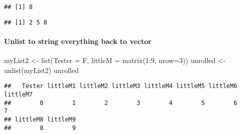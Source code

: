 \documentclass[
]{article}
\newenvironment{Shaded}{\begin{snugshade}}{\end{snugshade}}
\newcommand{\AttributeTok}[1]{\textcolor[rgb]{0.77,0.63,0.00}{#1}}
\newcommand{\CommentTok}[1]{\textcolor[rgb]{0.56,0.35,0.01}{\textit{#1}}}
\newcommand{\DecValTok}[1]{\textcolor[rgb]{0.00,0.00,0.81}{#1}}
\newcommand{\FunctionTok}[1]{\textcolor[rgb]{0.00,0.00,0.00}{#1}}
\newcommand{\NormalTok}[1]{#1}
\newcommand{\OtherTok}[1]{\textcolor[rgb]{0.56,0.35,0.01}{#1}}
\newcommand{\SpecialCharTok}[1]{\textcolor[rgb]{0.00,0.00,0.00}{#1}}
\begin{document}
\begin{verbatim}
## [1] 8
\end{verbatim}

\begin{Shaded}
\end{Shaded}

\begin{verbatim}
## [1] 2 5 8
\end{verbatim}

\hypertarget{unlist-to-string-everything-back-to-vector}{%
\paragraph{Unlist to string everything back to
vector}\label{unlist-to-string-everything-back-to-vector}}

\begin{Shaded}
\begin{Highlighting}[]
\NormalTok{myList2 }\OtherTok{\textless{}{-}} \FunctionTok{list}\NormalTok{(}\AttributeTok{Tester =}\NormalTok{ F, }\AttributeTok{littleM =} \FunctionTok{matrix}\NormalTok{(}\DecValTok{1}\SpecialCharTok{:}\DecValTok{9}\NormalTok{, }\AttributeTok{nrow=}\DecValTok{3}\NormalTok{))}
\NormalTok{unrolled }\OtherTok{\textless{}{-}} \FunctionTok{unlist}\NormalTok{(myList2)}
\NormalTok{unrolled}
\end{Highlighting}
\end{Shaded}

\begin{verbatim}
##   Tester littleM1 littleM2 littleM3 littleM4 littleM5 littleM6 littleM7 
##        0        1        2        3        4        5        6        7 
## littleM8 littleM9 
##        8        9
\end{verbatim}
\end{document}
